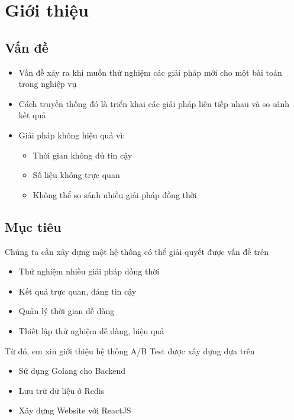 \section{Giới thiệu}

\subsection{Vấn đề}

\begin{frame}
	\begin{itemize}
		\item Vấn đề xảy ra khi muốn thử nghiệm các giải pháp mới cho một bài toán trong nghiệp vụ
		\item Cách truyền thống đó là triển khai các giải pháp liên tiếp nhau và so sánh kết quả
		\item Giải pháp không hiệu quả vì:
		      \begin{itemize}
			      \item Thời gian không đủ tin cậy
			      \item Số liệu không trực quan
			      \item Không thể so sánh nhiều giải pháp đồng thời
		      \end{itemize}
	\end{itemize}
\end{frame}

\subsection{Mục tiêu}

\begin{frame}
	Chúng ta cần xây dựng một hệ thống có thể giải quyết được vấn đề trên
	\begin{itemize}
		\item Thử nghiệm nhiều giải pháp đồng thời
		\item Kết quả trực quan, đáng tin cậy
		\item Quản lý thời gian dễ dàng
		\item Thiết lập thử nghiệm dễ dàng, hiệu quả
	\end{itemize}
	Từ đó, em xin giới thiệu hệ thống A/B Test được xây dựng dựa trên
	\begin{itemize}
		\item Sử dụng Golang cho Backend
		\item Lưu trữ dữ liệu ở Redis
		\item Xây dựng Website với ReactJS
	\end{itemize}
\end{frame}
